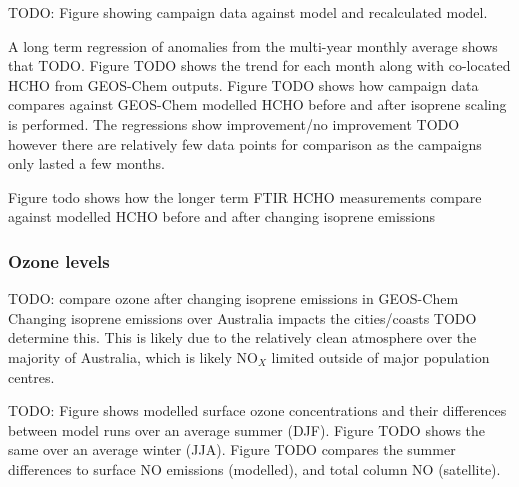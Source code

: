       TODO: Figure showing campaign data against model and recalculated model.
              
      A long term regression of anomalies from the multi-year monthly average shows that TODO.
      Figure TODO shows the trend for each month along with co-located HCHO from GEOS-Chem outputs.
      Figure TODO shows how campaign data compares against GEOS-Chem modelled HCHO before and after isoprene scaling is performed. 
      The regressions show improvement/no improvement TODO however there are relatively few data points for comparison as the campaigns only lasted a few months.
      

      Figure todo shows how the longer term FTIR HCHO measurements compare against modelled HCHO before and after changing isoprene emissions
    
    \subsubsection{Ozone levels}
    
      TODO: compare ozone after changing isoprene emissions in GEOS-Chem
      Changing isoprene emissions over Australia impacts the cities/coasts TODO determine this.
      This is likely due to the relatively clean atmosphere over the majority of Australia, which is likely NO$_X$ limited outside of major population centres.
      
      TODO: Figure shows modelled surface ozone concentrations and their differences between model runs over an average summer (DJF). 
      Figure TODO shows the same over an average winter (JJA).
      Figure TODO compares the summer differences to surface NO emissions (modelled), and total column NO (satellite).

%  
  